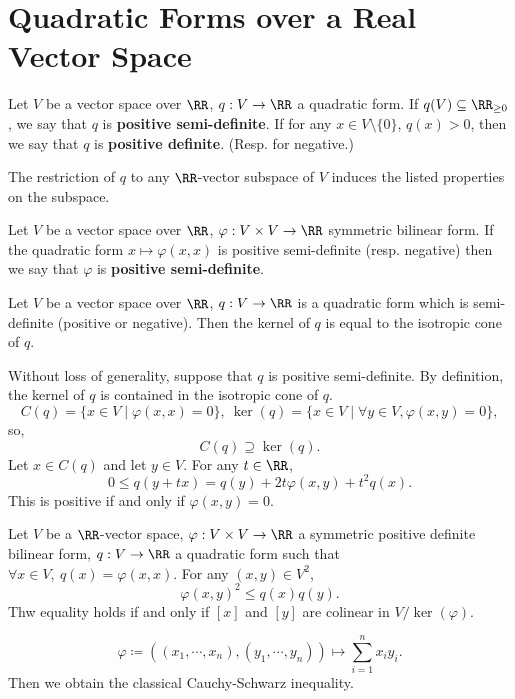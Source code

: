 \section{Quadratic Forms over a Real Vector Space}
\begin{definitionenv}
    Let $V$ be a vector space over $\RR$, $q: V\rightarrow \RR$ a quadratic form. If $q(V) \subseteq \RR_{\ge 0}$, we say that $q$ is \textbf{positive semi-definite}. If for any $x\in V\setminus\{0\}$, $q(x)>0$, then we say that $q$ is \textbf{positive definite}. (Resp. for negative.)

    \quad The restriction of $q$ to any $\RR$-vector subspace of $V$ induces the listed properties on the subspace.
\end{definitionenv}
\begin{definitionenv}
    Let $V$ be a vector space over $\RR$, $\varphi: V\times V\rightarrow \RR$ symmetric bilinear form.
    If the quadratic form $x\mapsto \varphi(x,x)$ is positive semi-definite (resp. negative) then we say that $\varphi$ is \textbf{positive semi-definite}.
\end{definitionenv}
\begin{lemmaenv}\label{2.4.3}
    Let $V$ be a vector space over $\RR$, $q:V\rightarrow \RR$ is a quadratic form which is semi-definite (positive or negative).
    Then the kernel of $q$ is equal to the isotropic cone of $q$.
\end{lemmaenv}
\begin{proofenv}
    Without loss of generality, suppose that $q$ is positive semi-definite. By definition, the kernel of $q$ is contained in the isotropic cone of $q$.
    $$ C(q) = \{ x\in V\mid \varphi(x,x) = 0 \},\ \ker(q) = \{x\in V\mid \forall y\in V, \varphi(x,y) = 0\},$$
    so,
    $$ C(q) \supseteq \ker(q).$$
    Let $x\in C(q)$ and let $y\in V$. For any $t\in\RR$,
    $$ 0\le q(y+ tx)  = q (y) + 2t\varphi(x,y) + t^2 q(x).$$
    This is positive if and only if $\varphi(x,y) = 0.$
\end{proofenv}
\begin{theoremenv}
    Let $V$ be a $\RR$-vector space, $\varphi:V\times V\rightarrow \RR$ a symmetric positive definite bilinear form, $q : V\rightarrow \RR$ a quadratic form such that $\forall x\in V,\ q(x) = \varphi(x,x).$
    For any $(x,y)\in V^2$,
    $$ \varphi(x,y)^2 \le q(x)q(y).$$
    Thw equality holds if and only if $[x]$ and $[y]$ are colinear in $V/\ker(\varphi)$.
\end{theoremenv}
\begin{remark}
    $$\varphi \coloneq \left((x_1,\cdots,x_n),(y_1,\cdots,y_n)\right)\mapsto \sum_{i=1}^{n}x_iy_i.$$
    Then we obtain the classical Cauchy-Schwarz inequality.
\end{remark}
